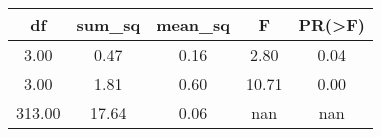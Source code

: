 \begin{tabular}{|c|c|c|c|c|}
\toprule
    df &  sum\_sq &  mean\_sq &     F &  PR(>F) \\
\midrule
  3.00 &    0.47 &     0.16 &  2.80 &    0.04 \\
  3.00 &    1.81 &     0.60 & 10.71 &    0.00 \\
313.00 &   17.64 &     0.06 &   nan &     nan \\
\bottomrule
\end{tabular}
